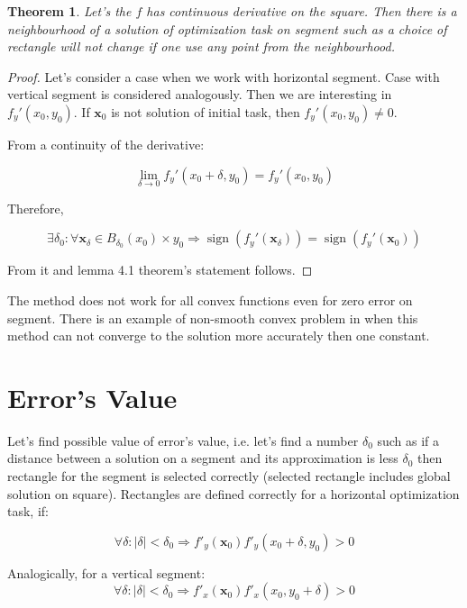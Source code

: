 \documentclass[12pt]{article}
\newtheorem{theorem}{Theorem}[section]
\DeclareMathOperator{\sign}{sign}
\begin{document}
\begin{theorem}
Let's the $f$ has continuous derivative on the square. Then there is a neighbourhood of a solution of optimization task on segment such as a choice of rectangle will not change if one use any point from the   neighbourhood.
\end{theorem}
\begin{proof}
Let's consider a case when we work with horizontal segment. Case with vertical segment is considered analogously. Then we are interesting in $f_y'(x_0, y_0)$. If $\textbf{x}_0$ is not solution of initial task, then $f_y'(x_0, y_0) \neq 0$. 

From a continuity of the derivative:

$$\lim\limits_{\delta \rightarrow 0}f_y'(x_0+\delta, y_0) = f_y'(x_0, y_0)$$

Therefore, 

$$\exists \delta_0:\forall \textbf{x}_\delta\in B_{\delta_0}(x_0)\times y_0\Rightarrow \sign(f_y'(\textbf{x}_\delta)) = \sign(f_y'(\textbf{x}_0))$$

From it and lemma 4.1 theorem's statement follows.

\end{proof}

The method does not work for all convex functions even for zero error on segment. There is an example of non-smooth convex problem in \cite{Ston_Pas} when this method can not converge to the solution more accurately then one constant.

\section{Error's Value}
\label{Delta}

Let's find possible value of error's value, i.e. let's find a number $\delta_0$ such as if a distance between a solution on a segment and its approximation is less $\delta_0$ then rectangle for the segment is selected correctly (selected rectangle includes global solution on square). Rectangles are defined correctly for a horizontal optimization task, if:

\begin{equation}\label{MCH}
\forall\delta : |\delta| < \delta_0 \Rightarrow f'_y(\textbf{x}_0)f'_y(x_0+\delta, y_0) > 0
\end{equation}

Analogically, for a vertical segment:
\begin{equation}\label{MCV}
\forall\delta: |\delta| < \delta_0 \Rightarrow f'_x(\textbf{x}_0)f'_x(x_0, y_0+\delta) > 0
\end{equation}
\end{document}
